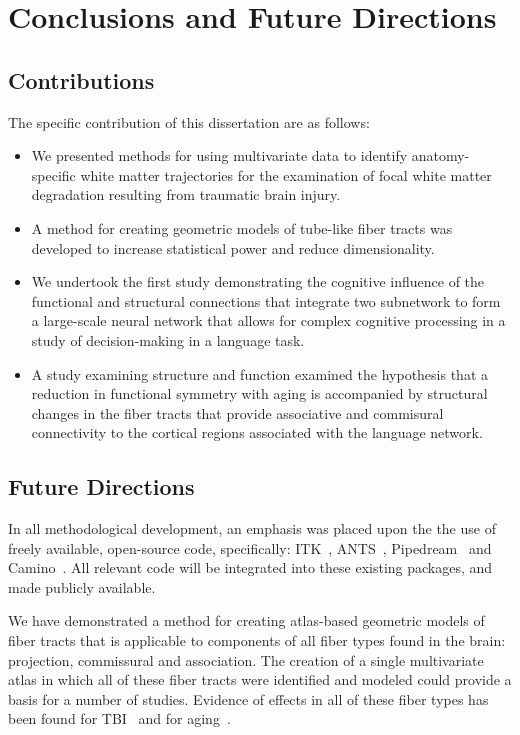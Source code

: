 
\chapter{Conclusions and Future Directions}
\label{chap_conclusions}

\section{Contributions}
The specific contribution of this dissertation are as follows:
\begin{itemize}
\item We presented methods for using multivariate data to identify anatomy-specific white matter trajectories for the examination of focal white matter degradation resulting from traumatic brain injury.
\item A method for creating geometric models of tube-like fiber tracts was developed to increase statistical power and reduce dimensionality.
\item We undertook the first study demonstrating the cognitive influence of the functional and structural connections that integrate two subnetwork to form a large-scale neural network that allows for complex cognitive processing in a study of decision-making in a language task.
\item A study examining structure and function examined the hypothesis that a reduction in functional symmetry with aging is accompanied by structural changes in the fiber tracts that provide associative and commisural connectivity to the cortical regions associated with the language network.
\end{itemize}

\section{Future Directions}
In all methodological development, an emphasis was placed upon the the use of freely available, open-source code, specifically: ITK~\cite{Yoo2002}, ANTS~\cite{ANTS}, Pipedream~\cite{Pipedream} and Camino~\cite{Cook2006}. All relevant code will be integrated into these existing packages, and made publicly available. 

We have demonstrated a method for creating atlas-based geometric models of fiber tracts that is applicable to components of all fiber types found in the brain: projection, commissural and association. The creation of a single multivariate atlas in which all of these fiber tracts were identified and modeled could provide a basis for a number of studies. Evidence of effects in all of these fiber types has been found for TBI~\cite{duda08mmbia,Sidaros2008,Karunanayaka2007} and for aging~\cite{Ardekani2007,Salat2005,Bastin2010}.

